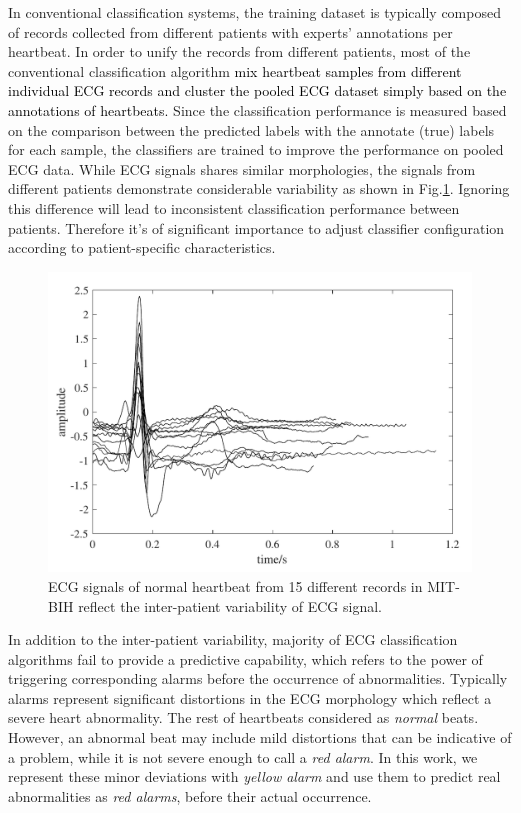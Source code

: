 In conventional classification systems, the training dataset is typically composed of records collected from different patients with experts' annotations per heartbeat. In order to unify the records from different patients, most of the conventional classification algorithm \textcolor{black}{mix heartbeat samples from different individual ECG records and cluster the pooled ECG dataset simply based on the annotations of heartbeats.} %
Since the classification performance is measured based on the comparison between the predicted labels with the annotate (true) labels for each sample, the classifiers are trained to improve the performance on pooled ECG data. While ECG signals shares similar morphologies, the signals from different patients demonstrate considerable variability as shown in Fig.\ref{fig:interpatient_variability}. Ignoring this difference will lead to inconsistent classification performance between patients. Therefore it's of significant importance to adjust classifier configuration according to patient-specific characteristics.  %

 \begin{figure}[thpb]
 	\centering
 	\includegraphics[scale=0.7]{Fig/interpatient_variability.pdf}
 	\caption{ECG signals of normal heartbeat from 15 different records in MIT-BIH reflect the inter-patient variability of ECG signal.}
 	\label{fig:interpatient_variability}
 \end{figure}

In addition to the inter-patient variability, majority of ECG classification algorithms fail to provide a predictive capability, which refers to the power of triggering corresponding alarms before the occurrence of abnormalities. Typically alarms represent significant distortions in the ECG morphology which reflect a severe heart abnormality. The rest of heartbeats considered as \textit{normal} beats. However, an abnormal beat may include mild distortions that can be indicative of a problem, while it is not severe enough to call a \textit{red alarm}. In this work, we represent these minor deviations with \textit{yellow alarm} and use them to predict real abnormalities as \textit{red alarms}, before their actual occurrence.

